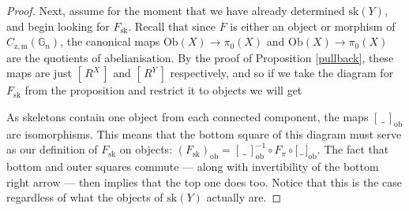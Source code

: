 \documentclass{amsart} %
\newenvironment{eq*}{\begin{equation*}}{\end{equation*}}
\begin{document}
\begin{proof}
Next, assume for the moment that we have already determined $\mathrm{sk}(Y)$, and begin looking for $F_{\mathrm{sk}}$. Recall that since $F$ is either an object or morphism of $C_{\mathrm{z}, \mathrm{m}}(\mathbb{G}_n)$, the canonical maps $\mathrm{Ob}(X) \to \pi_0(X)$ and $\mathrm{Ob}(X) \to \pi_0(X)$ are the quotients of abelianisation. By the proof of Proposition \ref{pullback}, these maps are just $[ \, R^X \, ]$ and $[ \, R^Y \, ]$ respectively, and so if we take the diagram for $F_{\mathrm{sk}}$ from the proposition and restrict it to objects we will get
\begin{eq*}  \end{eq*}
As skeletons contain one object from each connected component, the maps $[\, \_ \,]_{\mathrm{ob}}$ are isomorphisms. This means that the bottom square of this diagram must serve as our definition of $F_{\mathrm{sk}}$ on objects: $(F_{\mathrm{sk}})_{\mathrm{ob}} = [ \, \_ \, ]_{\mathrm{ob}}^{-1} \circ F_\pi \circ \lbrack \, \_ \, \rbrack_{\mathrm{ob}}$. The fact that bottom and outer squares commute --- along with invertibility of the bottom right arrow --- then implies that the top one does too. Notice that this is the case regardless of what the objects of $\mathrm{sk}(Y)$ actually are.


\end{proof}
\end{document}
